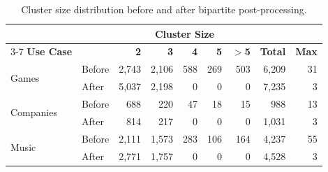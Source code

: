 
\begin{table}[t]
\caption{Cluster size distribution before and after bipartite post-processing.}
\label{tab:cluster_stats}
\centering
\setlength{\tabcolsep}{3pt}
\begin{tabular}{@{}l l rrrrr r r@{}}
\toprule
& & \multicolumn{5}{c}{\textbf{Cluster Size}} & & \\
\cmidrule(lr){3-7}
\textbf{Use Case} & & \textbf{2} & \textbf{3} & \textbf{4} & \textbf{5} & \textbf{$>$5} & \textbf{Total} & \textbf{Max} \\
\midrule
\multirow{2}{*}{Games}
& Before & 2,743 & 2,106 & 588 & 269 & 503 & 6,209 & 31 \\
& After & 5,037 & 2,198 & 0 & 0 & 0 & 7,235 & 3 \\
\midrule
\multirow{2}{*}{Companies}
& Before & 688 & 220 & 47 & 18 & 15 & 988 & 13 \\
& After & 814 & 217 & 0 & 0 & 0 & 1,031 & 3 \\
\midrule
\multirow{2}{*}{Music}
& Before & 2,111 & 1,573 & 283 & 106 & 164 & 4,237 & 55 \\
& After & 2,771 & 1,757 & 0 & 0 & 0 & 4,528 & 3 \\
\bottomrule
\end{tabular}
\end{table}




